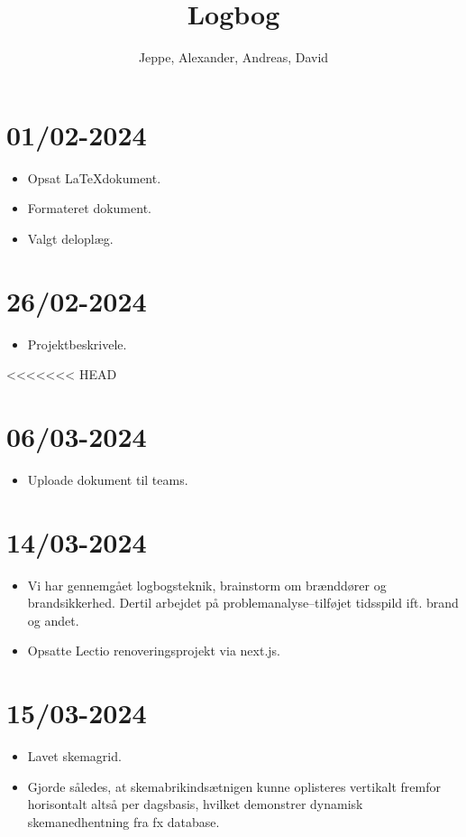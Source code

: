 \documentclass[12pt, a4paper]{article}
\title{Logbog}
\author{Jeppe, Alexander, Andreas, David}
\date{}
\begin{document}
    \maketitle
    \tableofcontents
    \newpage

    \section{01/02-2024}
        \begin{itemize}
            \item Opsat \LaTeX dokument.
            \item Formateret dokument.
            \item Valgt deloplæg.
        \end{itemize}

    \section{26/02-2024}
        \begin{itemize}
            \item Projektbeskrivele.
        \end{itemize}
<<<<<<< HEAD

    \section{06/03-2024}
        \begin{itemize}
            \item Uploade dokument til teams. 
        \end{itemize}

    \section{14/03-2024}
        \begin{itemize}
            \item Vi har gennemgået logbogsteknik, brainstorm om brænddører og brandsikkerhed. Dertil arbejdet på problemanalyse--tilføjet tidsspild ift. brand og andet.
            \item Opsatte Lectio renoveringsprojekt via next.js.
        \end{itemize}

    \section{15/03-2024}
        \begin{itemize}
            \item Lavet skemagrid.
            \item Gjorde således, at skemabrikindsætnigen kunne oplisteres vertikalt fremfor horisontalt altså per dagsbasis, hvilket demonstrer dynamisk skemanedhentning fra fx database.
        \end{itemize}
\end{document}
